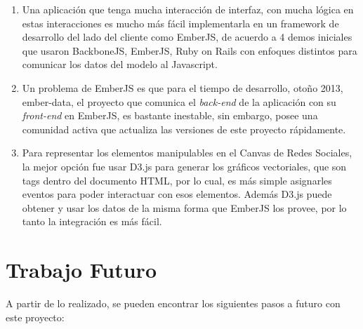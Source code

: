   \begin{enumerate}
    \item Una aplicación que tenga mucha interacción de interfaz, con mucha lógica en estas interacciones es mucho más fácil implementarla en un framework de desarrollo del lado del cliente como EmberJS, de acuerdo a 4 demos iniciales que usaron BackboneJS, EmberJS, Ruby on Rails con enfoques distintos para comunicar los datos del modelo al Javascript.
    
    \item Un problema de EmberJS es que para el tiempo de desarrollo, otoño 2013, ember-data, el proyecto que comunica el \emph{back-end} de la aplicación con su \emph{front-end} en EmberJS, es bastante inestable, sin embargo, posee una comunidad activa que actualiza las versiones de este proyecto rápidamente.
    
    \item Para representar los elementos manipulables en el Canvas de Redes Sociales, la mejor opción fue usar D3.js para generar los gráficos vectoriales, que son tags dentro del documento HTML, por lo cual, es más simple asignarles eventos para poder interactuar con esos elementos. Además D3.js puede obtener y usar los datos de la misma forma que EmberJS los provee, por lo tanto la integración es más fácil.
  \end{enumerate}




\section{Trabajo Futuro} %
\label{sec:trabajo_futuro}

A partir de lo realizado, se pueden encontrar los siguientes pasos a futuro con este proyecto:

